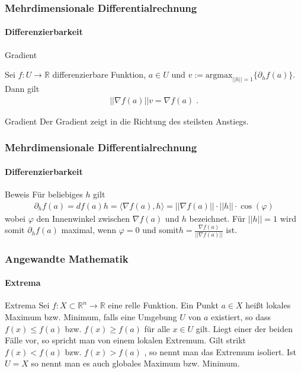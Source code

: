 \documentclass{beamer}
\begin{document}
    
    \begin{frame}
        \frametitle{Mehrdimensionale Differentialrechnung}
    \framesubtitle{Differenzierbarkeit}
        \begin{block}{Gradient}
    
    Sei   $f: U \to \mathbb{R}$ differenzierbare Funktion,  $a \in U$ und $v := \text{argmax}_{ ||h|| = 1 } \{ \partial_h f(a) \}$.
    Dann gilt 
    \begin{align*}
    || \nabla f(a) || v =  \nabla f(a) \; .
    \end{align*} 
    \end{block}
    \begin{block}{Gradient}
    Der Gradient zeigt in die Richtung des steilsten Anstiegs.
    \end{block}
    
     \end{frame}
    
    \begin{frame}
        \frametitle{Mehrdimensionale Differentialrechnung}
    \framesubtitle{Differenzierbarkeit}
        \begin{block}{Beweis}
    Für beliebiges $h$ gilt 
    \begin{align*}
    \partial_h f(a) = df(a) h = \langle \nabla f(a) , h \rangle = || \nabla f(a)||  \cdot ||h|| \cdot \cos(\varphi) 
    \end{align*} 
    wobei $\varphi$ den Innenwinkel zwischen $\nabla f(a)$ und $h$ bezeichnet. Für $||h|| = 1$ wird somit $\partial_h f(a) $ maximal, wenn $\varphi = 0$ und somit$h =  \frac{\nabla f(a)}{||\nabla f(a)||}$ ist.
    \end{block}
    
     \end{frame}
    



\begin{frame}
    \frametitle{Angewandte Mathematik}
\framesubtitle{Extrema}
    \begin{block}{Extrema}
Sei $f : X \subset \mathbb{R}^n \to \mathbb{R}$ eine relle Funktion.  Ein Punkt $a \in  X$ heißt lokales Maximum bzw. Minimum, falls eine Umgebung $U$ von $a$ existiert, so dass $f(x) \leq f(a)$ bzw.  $f(x) \geq f(a)$ für alle $x \in U$ gilt. Liegt einer der beiden Fälle vor, so spricht man von einem lokalen Extremum. Gilt strikt $f(x) <  f(a)$ bzw.  $f(x) > f(a)$ , so nennt man das Extremum isoliert. Ist $U = X$ so nennt man es auch globales Maximum bzw. Minimum.
\end{block}
 \end{frame}
\end{document}
